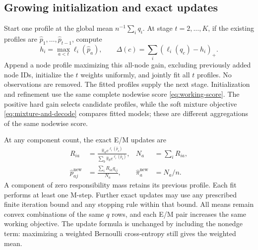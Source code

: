 \documentclass[11pt]{article}
\theoremstyle{definition}
\theoremstyle{remark}
\numberwithin{equation}{section}
\begin{document}
\subsection{Growing initialization and exact updates}
\label{sec:growing-branch}
Start one profile at the global mean $n^{-1}\sum_iq_i$. At stage $t=2,\ldots,K$, if the existing profiles are $\widehat p_1,\ldots,\widehat p_{t-1}$, compute
\begin{equation}
 h_i=\max_{a<t}\ell_i(\widehat p_a),\qquad
 \Delta(c)=\sum_i(\ell_i(q_c)-h_i)_+.
 \label{eq:growing-gain}
\end{equation}
Append a node profile maximizing this all-node gain, excluding previously added node IDs, initialize the $t$ weights uniformly, and jointly fit all $t$ profiles. No observations are removed. The fitted profiles supply the next stage. Initialization and refinement use the same complete nodewise score \eqref{eq:working-score}. The positive hard gain selects candidate profiles, while the soft mixture objective \eqref{eq:mixture-and-decode} compares fitted models; these are different aggregations of the same nodewise score.

At any component count, the exact E/M updates are
\begin{align}
 R_{ia}&=\frac{\widehat\pi_a e^{\ell_i(\widehat p_a)}}
                  {\sum_b\widehat\pi_b e^{\ell_i(\widehat p_b)}},
 &N_a&=\sum_iR_{ia},\label{eq:responsibilities}\\
 \widehat p_{aj}^{\mathrm{new}}&=\frac{\sum_iR_{ia}q_{ij}}{N_a},
 &\widehat\pi_a^{\mathrm{new}}&=N_a/n.
 \label{eq:mstep}
\end{align}
A component of zero responsibility mass retains its previous profile. Each fit performs at least one M-step. Further exact updates may use any prescribed finite iteration bound and any stopping rule within that bound. All means remain convex combinations of the same $q$ rows, and each E/M pair increases the same working objective. The update formula is unchanged by including the nonedge term: maximizing a weighted Bernoulli cross-entropy still gives the weighted mean.
\end{document}
